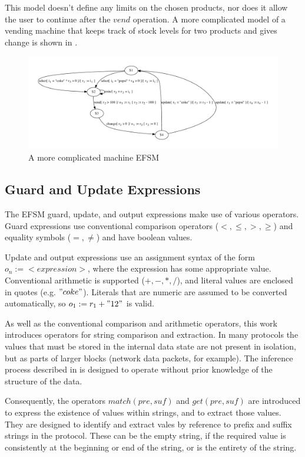 This model doesn't define any limits on the chosen products, nor does it allow the user to continue after the $vend$ operation. A more complicated model of a vending machine that keeps track of stock levels for two products and gives change is shown in .

\begin{figure}[h]
\begin{center}
\includegraphics[width=13cm]{figures/efsm/vend-complicated.pdf}
\caption{A more complicated machine EFSM}
\label{fig:vendcomplicated}
\end{center}
\end{figure}

\subsection{Guard and Update Expressions}
\label{Expressions}

The EFSM guard, update, and output expressions make use of various operators. Guard expressions use conventional comparison operators ($<, \leq, >, \geq$) and equality symbols ($=, \neq$) and have boolean values.

Update and output expressions use an assignment syntax of the form $o_n := <expression>$, where the expression has some appropriate value. Conventional arithmetic is supported ($+,-,*,/$), and literal values are enclosed in quotes (e.g. $"coke"$). Literals that are numeric are assumed to be converted automatically, so $o_1 := r_1 + "12"$ is valid. 

As well as the conventional comparison and arithmetic operators, this work introduces operators for string comparison and extraction. In many protocols the values that must be stored in the internal data state are not present in isolation, but as parts of larger blocks (network data packets, for example). The inference process described in  is designed to operate without prior knowledge of the structure of the data. 

Consequently, the operators $match(pre,suf)$ and $get(pre,suf)$ are introduced to express the existence of values within strings, and to extract those values. They are designed to identify and extract vales by reference to prefix and suffix strings in the protocol. These can be the empty string, if the required value is consistently at the beginning or end of the string, or is the entirety of the string. 

